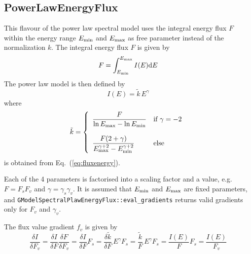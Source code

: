 \documentclass{article}[12pt,a4]
\begin{document}
\subsection{PowerLawEnergyFlux}

This flavour of the power law spectral model uses the integral energy flux $F$ within the
energy range $E_{\rm min}$ and $E_{\rm max}$ as free parameter instead of
the normalization $k$.
The integral energy flux $F$ is given by
\begin{equation}
F = \int_{E_{\rm min}}^{E_{\rm max}} I(E) {\rm d}E
\label{eq:fluxint}
\end{equation}
The power law model is then defined by
\begin{equation}
I(E) = \tilde{k} \, E^{\gamma}
\end{equation}
where
\begin{equation}
   \tilde{k} = \left \{
   \begin{array}{l l}
      \displaystyle
      \frac{F}{\ln E_{\rm max} - \ln E_{\rm min}} 
        & \mbox{if $\gamma = -2$} \\
     \\
     \displaystyle
      \frac{F (2+\gamma)}{E_{\rm max}^{\gamma+2}-E_{\rm min}^{\gamma+2}} 
        & \mbox{else}
   \end{array}
   \right .
\end{equation}
is obtained from Eq.~(\ref{eq:fluxenergy}).

Each of the 4 parameters is factorised into a scaling factor and a value, e.g.
$F=F_s F_v$ and $\gamma=\gamma_s \gamma_v$.
It is assumed that $E_{\rm min}$ and $E_{\rm max}$ are fixed parameters,
and {\tt GModelSpectralPlawEnergyFlux::eval\_gradients} returns valid gradients only for 
$F_v$ and $\gamma_v$.

The flux value gradient $f_v$ is given by
\begin{equation}
\frac{\delta I}{\delta F_v} = 
  \frac{\delta I}{\delta F} \frac{\delta F}{\delta F_v} = 
  \frac{\delta I}{\delta F} F_s = 
  \frac{\delta \tilde{k}}{\delta F} \, E^{\gamma} F_s = 
  \frac{\tilde{k}}{F} \, E^{\gamma} F_s = 
  \frac{I(E)}{F} F_s =
  \frac{I(E)}{F_v}
\end{equation}
\end{document}
